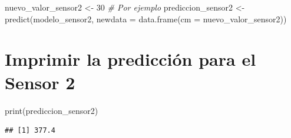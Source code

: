 \documentclass[
]{article}
\newenvironment{Shaded}{\begin{snugshade}}{\end{snugshade}}
\newcommand{\AttributeTok}[1]{\textcolor[rgb]{0.77,0.63,0.00}{#1}}
\newcommand{\CommentTok}[1]{\textcolor[rgb]{0.56,0.35,0.01}{\textit{#1}}}
\newcommand{\DecValTok}[1]{\textcolor[rgb]{0.00,0.00,0.81}{#1}}
\newcommand{\FunctionTok}[1]{\textcolor[rgb]{0.00,0.00,0.00}{#1}}
\newcommand{\NormalTok}[1]{#1}
\newcommand{\OtherTok}[1]{\textcolor[rgb]{0.56,0.35,0.01}{#1}}
\begin{document}
\begin{Shaded}
\begin{Highlighting}[]
\NormalTok{nuevo\_valor\_sensor2 }\OtherTok{\textless{}{-}} \DecValTok{30} \CommentTok{\# Por ejemplo}
\NormalTok{prediccion\_sensor2 }\OtherTok{\textless{}{-}} \FunctionTok{predict}\NormalTok{(modelo\_sensor2, }\AttributeTok{newdata =} \FunctionTok{data.frame}\NormalTok{(}\AttributeTok{cm =}\NormalTok{ nuevo\_valor\_sensor2))}
\end{Highlighting}
\end{Shaded}

\hypertarget{imprimir-la-predicciuxf3n-para-el-sensor-2}{%
\section{Imprimir la predicción para el Sensor
2}\label{imprimir-la-predicciuxf3n-para-el-sensor-2}}

\begin{Shaded}
\begin{Highlighting}[]
\FunctionTok{print}\NormalTok{(prediccion\_sensor2)}
\end{Highlighting}
\end{Shaded}

\begin{verbatim}
## [1] 377.4
\end{verbatim}
\end{document}
